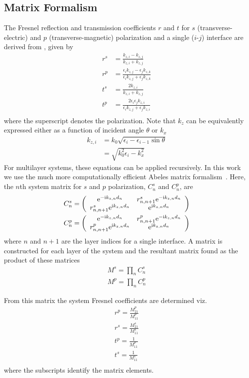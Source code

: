 \subsection{Matrix Formalism}
The Fresnel reflection and transmission coefficients $r$ and $t$ for $s$
(transverse-electric) and $p$ (transverse-magnetic) polarization and a
single ($i$-$j$) interface are derived from , given
by
\begin{align}
r^s &= \frac{k_{z,i}-k_{z,j}}{k_{z,i}+k_{z,j}}\\
r^p &= \frac{\epsilon_i k_{z,j} - \epsilon_j k_{z,k}}{\epsilon_i k_{z,j} + \epsilon_j k_{z,k}} \\
t^s &= \frac{2 k_{z,i}}{k_{z,i}+k_{z,j}}\\
t^p &= \frac{2 \epsilon_i \epsilon_j k_{z,i}}{\epsilon_i k_{z,j} + \epsilon_j k_{z,i}}\\
\end{align}
where the superscript denotes the polarization.
Note that $k_{z}$ can be equivalently expressed either as a
function of incident angle $\theta$ or $k_x$
\begin{align}
 k_{z,i} &= k_0 \sqrt{\epsilon_i - \epsilon_{i-1} \sin \theta}\\
&= \sqrt{k_0^2\epsilon_i - k_x^2}
\end{align}
For multilayer systems, these equations can be applied recursively. In
this work we use the much more computationally efficient
Abeles matrix formalism~\cite{abeles1948propagation}.  Here, the $n$th system matrix for $s$ and $p$
polarization, $C^s_n$ and $C^p_n$, are
\begin{align}
C^s_n = \left(\begin{array}{cc}
{\mathrm{e}}^{-{\mathrm{i}} k_{z,n} d_n} & r^s_{n,n+1} {\mathrm{e}}^{-{\mathrm{i}} k_{z,n} d_n} \\
r^s_{n,n+1} {\mathrm{e}}^{{\mathrm{i}} k_{z,n} d_n} & {\mathrm{e}}^{{\mathrm{i}} k_{z,n} d_n}
\end{array}\right)\\
C^p_n = \left(\begin{array}{cc}
{\mathrm{e}}^{-{\mathrm{i}} k_{z,n} d_n} & r^p_{n,n+1} {\mathrm{e}}^{-{\mathrm{i}} k_{z,n} d_n} \\
r^p_{n,n+1} {\mathrm{e}}^{{\mathrm{i}} k_{z,n} d_n} & {\mathrm{e}}^{{\mathrm{i}} k_{z,n} d_n}
\end{array}\right)
\end{align}
where $n$ and $n+1$ are the layer indices for a single interface.  A
matrix is constructed for each layer of the system and the resultant matrix
found as the product of these matrices
\begin{align}
M^s=\prod_n C^s_n\\
M^p=\prod_n C^p_n
\end{align}

From this matrix the system Fresnel coefficients are determined viz.
\begin{align}
r^p = \frac{M^p_{21}}{M^p_{11}}\\
r^s = \frac{M^s_{21}}{M^s_{11}}\\
t^p = \frac{1}{M^p_{11}}\\
t^s = \frac{1}{M^s_{11}}\\
\end{align}
where the subscripts identify the matrix elements.

